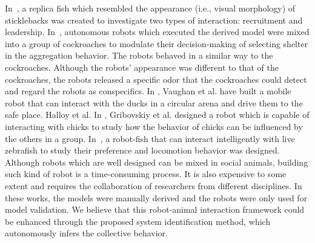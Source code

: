 In~\cite{Faria2010}, a replica fish which resembled the appearance (i.e., visual morphology) of sticklebacks was created to investigate two types of interaction: recruitment and leadership. In~\cite{J.Halloy2007}, autonomous robots which executed the derived model were mixed into a group of cockroaches to modulate their decision-making of selecting shelter in the aggregation behavior. The robots behaved in a similar way to the cockroaches. Although the robots' appearance was different to that of the cockroaches, the robots released a specific odor that the cockroaches could detect and regard the robots as conspecifics. In \cite{Vaughan_1998, Vaughan2000}, Vaughan et al. have built a mobile robot that can interact with the ducks in a circular arena and drive them to the safe place. Halloy et al. In \cite{Gribovskiy_2010}, Gribovskiy et al. designed a robot which is capable of interacting with chicks to study how the behavior of chicks can be influenced by the others in a group.  In~\citep{Kopman2013}, a robot-fish that can interact intelligently with live zebrafish to study their preference and locomotion behavior was designed. Although robots which are well designed can be mixed in social animals, building such kind of robot is a time-consuming process. It is also expensive to some extent and requires the collaboration of researchers from different disciplines. In these works, the models were manually derived and the robots were only used for model validation. We believe that this robot-animal interaction framework could be enhanced through the proposed system identification method, which autonomously infers the collective behavior. 

\clearpage 

